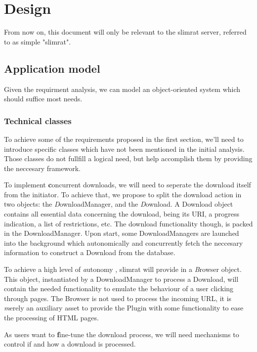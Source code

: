 \documentclass{article}
\begin{document}
%
%
\newpage
\section{Design}

From now on, this document will only be relevant to the slimrat server, referred to as simple "slimrat".

\subsection{Application model}

Given the requirment analysis, we can model an object-oriented system which should suffice most needs.

\subsubsection{Technical classes}

To achieve some of the requirements proposed in the first section, we'll need to introduce specific classes which have not been mentioned in the initial analysis. Those classes do not fullfill a logical need, but help accomplish them by providing the neccesary framework.

To implement {\textbf concurrent downloads}, we will need to seperate the download itself from the initiator. To achieve that, we propose to split the download action in two objects: the {\textit DownloadManager}, and the {\textit Download}. A Download object contains all essential data concerning the download, being its URI, a progress indication, a list of restrictions, etc. The download functionality though, is packed in the DownloadManager. Upon start, some DownloadManagers are launched into the background which autonomically and concurrently fetch the neccesary information to construct a Download from the database.

To achieve a high level of {\textit autonomy }, slimrat will provide in a {\textit Browser} object. This object, instantiated by a DownloadManager to process a Download, will contain the needed functionality to emulate the behaviour of a user clicking through pages. The Browser is not used to process the incoming URL, it is {\textit merely an auxiliary asset} to provide the Plugin with some functionality to ease the processing of HTML pages.

As users want to {\textbf fine-tune the download process}, we will need mechanisms to control if and how a download is processed.
\end{document}
